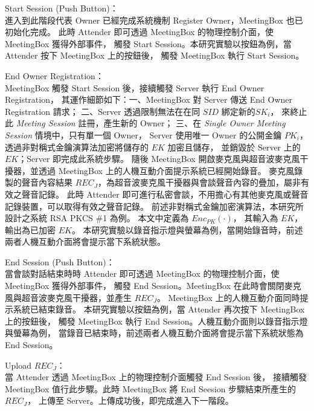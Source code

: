 \begin{steps}
    \item Start Session (Push Button)：\\
        進入到此階段代表 Owner 已經完成系統機制 Register Owner，MeetingBox 也已初始化完成。
        此時 Attender 即可透過 MeetingBox 的物理控制介面，使 MeetingBox 獲得外部事件，
        觸發 Start Session。本研究實驗以按鈕為例，當 Attender 按下 MeetingBox 上的按鈕後，
        觸發 MeetingBox 執行 Start Session。

    \item End Owner Registration：\\
        MeetingBox 觸發 Start Session 後，接續觸發 Server 執行 End Owner Registration，
        其運作細節如下：一、MeetingBox 對 Server 傳送 End Owner Registration 請求；
        二、Server 透過限制無法在在同 $SID$ 綁定新的$SK_{i}$，
        來終止此 {\it Meeting Session} 註冊，產生新的 Owner；
        三、在 {\it Single Owner Meeting Session} 情境中，只有單一個 Owner，
        Server 使用唯一 Owner 的公開金鑰 $PK_{i}$，透過非對稱式金鑰演算法加密將儲存的 $EK$ 加密且儲存，
        並銷毀於 Server 上的 $EK$；Server 即完成此系統步驟。
        隨後 MeetingBox 開啟麥克風與超音波麥克風干擾器，並透過 MeetingBox 上的人機互動介面提示系統已經開始錄音。
        麥克風錄製的聲音內容結果 $REC_{J}$，為超音波麥克風干擾器與會談聲音內容的疊加，屬非有效之聲音記錄。
        此時 Attender 即可進行私密會談，不用擔心有其他麥克風或聲音記錄裝置，可以取得有效之聲音記錄。
        前述非對稱式金鑰加密演算法，本研究所設計之系統 RSA PKCS \#1 為例。 本文中定義為 $Enc_{PK}(·)$，
        其輸入為 $EK$，輸出為已加密 $EK$。
        本研究實驗以錄音指示燈與螢幕為例，當開始錄音時，前述兩者人機互動介面將會提示當下系統狀態。

    \item End Session (Push Button)：\\
        當會談對話結束時時 Attender 即可透過 MeetingBox 的物理控制介面，使 MeetingBox 獲得外部事件，
        觸發 End Session。MeetingBox 在此時會關閉麥克風與超音波麥克風干擾器，並產生 $REC_{J}$。
        MeetingBox 上的人機互動介面同時提示系統已結束錄音。
        本研究實驗以按鈕為例，當 Attender 再次按下 MeetingBox 上的按鈕後，
        觸發 MeetingBox 執行 End Session。人機互動介面則以錄音指示燈與螢幕為例，
        當錄音已結束時，前述兩者人機互動介面將會提示當下系統狀態為 End Session。

    \item Upload $REC_{J}$：\\
        當 Attender 透過 MeetingBox 上的物理控制介面觸發 End Session 後，
        接續觸發 MeetingBox 值行此步驟。此時 MeetingBox 將 End Seesion 步驟結束所產生的 $REC_{J}$，
        上傳至 Server。上傳成功後，即完成進入下一階段。
\end{steps}


